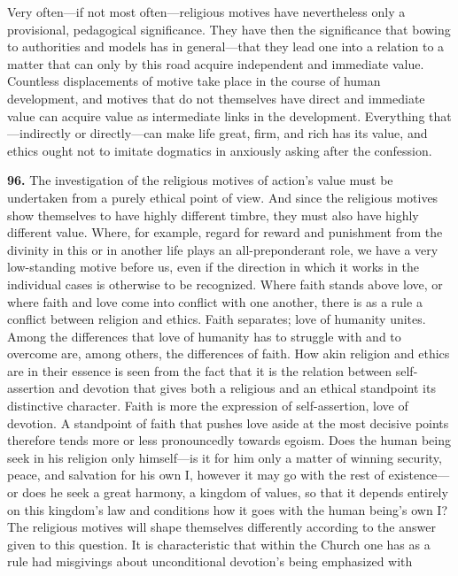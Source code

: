 \documentclass[12pt,a4paper]{book}
\newcommand{\opage}[1]{\marginnote{\footnotesize\textit{[#1]}}}
\begin{document}
Very often---if not most often---religious motives have nevertheless only a provisional, pedagogical
significance. They have then the significance that bowing to authorities and models has in general---that
they lead one into a relation to a matter that can only by this road acquire independent and immediate
value. Countless displacements of motive take place in the course of human development, and motives that
do not themselves have direct and immediate value can acquire value as intermediate links in the
development. Everything that---indirectly or directly---can make life great, firm, and 
\opage{219}rich has its
value, and ethics ought not to imitate dogmatics in anxiously asking after the confession.

\medskip

\noindent\textbf{96.} The investigation of the religious motives of action's value must be undertaken
from a purely ethical point of view. And since the religious motives show themselves to have highly
different timbre, they must also have highly different value. Where, for example, regard for reward and
punishment from the divinity in this or in another life plays an all-preponderant role, we have a very
low-standing motive before us, even if the direction in which it works in the individual cases is
otherwise to be recognized. Where faith stands above love, or where faith and love come into conflict
with one another, there is as a rule a conflict between religion and ethics. Faith separates; love of
humanity unites. Among the differences that love of humanity has to struggle with and to overcome are,
among others, the differences of faith. How akin religion and ethics are in their essence is seen from
the fact that it is the relation between self-assertion and devotion that gives both a religious and an
ethical standpoint its distinctive character. Faith is more the expression of self-assertion, love of
devotion. A standpoint of faith that pushes love aside at the most decisive points therefore tends more
or less pronouncedly towards egoism. Does the human being seek in his religion only himself---is it for
him only a matter of winning security, peace, and salvation for his own I, however it may go with the
rest of existence---or does he seek a great harmony, a kingdom of values, so that it depends entirely on
this kingdom's law and conditions how it goes with the human being's own I? The religious motives will
shape themselves differently according to the answer given to this question. It is characteristic that
within the Church one has as a rule had misgivings about unconditional devotion's being emphasized with
\end{document}
